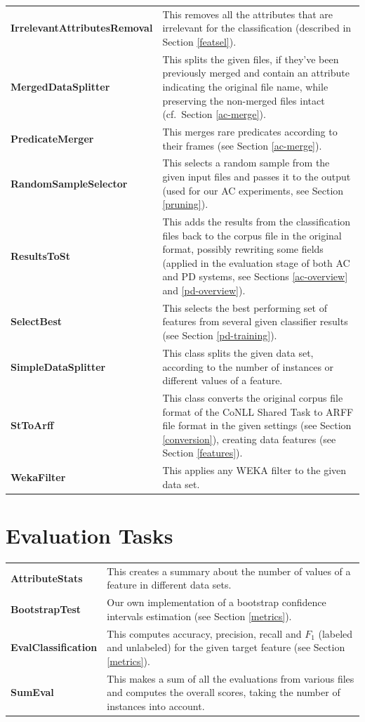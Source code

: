\documentclass[12pt,notitlepage,a4paper]{report}
\begin{document}
\begin{longtable}{p{}p{}}
\bf IrrelevantAttributes\-Removal & This removes all the attributes that are irrelevant for the classification (described in Section \ref{featsel}). \\
\bf MergedDataSplitter & This splits the given files, if they've been previously merged and contain an attribute indicating the original file name, while preserving the non-merged files intact (cf.\ Section \ref{ac-merge}). \\
\bf PredicateMerger & This merges rare predicates according to their frames (see Section \ref{ac-merge}). \\
\bf RandomSampleSelector & This selects a random sample from the given input files and passes it to the output (used for our AC experiments, see Section \ref{pruning}). \\
\bf ResultsToSt & This adds the results from the classification files back to the corpus file in the original format, possibly rewriting some fields (applied in the evaluation stage of both AC and PD systems, see Sections \ref{ac-overview} and \ref{pd-overview}). \\
\bf SelectBest & This selects the best performing set of features from several given classifier results (see Section \ref{pd-training}). \\
\bf SimpleDataSplitter & This class splits the given data set, according to the number of instances or different values of a feature. \\
\bf StToArff & This class converts the original corpus file format of the CoNLL Shared Task to ARFF file format in the given settings (see Section \ref{conversion}), creating data features (see Section \ref{features}). \\
\bf WekaFilter & This applies any WEKA filter to the given data set. \\
\end{longtable}

\section*{Evaluation Tasks}

\footnotesize
\renewcommand{\arraystretch}{1.5}
\begin{longtable}{p{}p{}}
\bf AttributeStats & This creates a summary about the number of values of a feature in different data sets. \\
\bf BootstrapTest & Our own implementation of a bootstrap confidence intervals estimation (see Section \ref{metrics}). \\
\bf EvalClassification & This computes accuracy, precision, recall and $F_1$ (labeled and unlabeled) for the given target feature (see Section \ref{metrics}). \\
\bf SumEval & This makes a sum of all the evaluations from various files and computes the overall scores, taking the number of instances into account. \\
\end{longtable}
\end{document}
